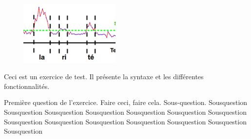

\begin{figure}
    \centering
    \includegraphics[width=5cm]{images/1.png}
\end{figure}

Ceci est un exercice de test. Il présente la syntaxe et les différentes fonctionnalités.

\question Première question de l'exercice. Faire ceci, faire cela.
\subquestion Sous-question.
\question \subquestion Sousquestion
\question\subquestion Sousquestion
\question\subquestion Sousquestion
\question\subquestion Sousquestion
\question\subquestion Sousquestion
\question\subquestion Sousquestion
\question\subquestion Sousquestion
\question\subquestion Sousquestion
\question\subquestion Sousquestion
\question\subquestion Sousquestion
\question\subquestion Sousquestion
\question\subquestion Sousquestion
\question\subquestion Sousquestion
\question\subquestion Sousquestion

